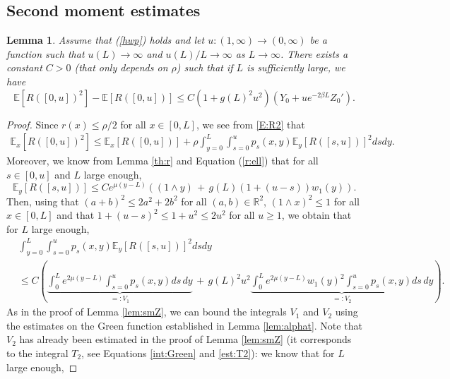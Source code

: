 \documentclass[11pt]{article}
\theoremstyle{plain}
\newtheorem{lemma}{Lemma}[section]
\begin{document}
\subsection{Second moment estimates}\label{sec:smR}
\begin{lemma}\label{lem:sdmR}
Assume that (\ref{hwp}) holds and let $u:(1,\infty)\rightarrow (0,\infty)$ be a function such that $u(L)\rightarrow \infty$  and $u(L)/L\rightarrow \infty$ as $L\rightarrow \infty$. There exists a constant $C>0$ (that only depends on $\rho$) such that if $L$ is sufficiently large, we have \begin{equation*}
\mathbb{E}\left[R([0,u])^2\right]-\mathbb{E}\left[R([0,u])\right]\leqslant C\left(1+g(L)^2u^2\right)(Y_0+ue^{-2\beta L}Z_0').
\end{equation*}
\end{lemma}
\begin{proof}
Since  $r(x)\leqslant \rho/2$ for all $x\in[0,L]$, we see from   \eqref{E:R2}  that
\begin{align*}
\mathbb{E}_x\left[R([0,u])^2\right]\leqslant \mathbb{E}_x\left[R([0,u])\right]+\rho\int_{y=0}^L\int_{s=0}^up_s(x,y)\mathbb{E}_y\left[R([s,u])\right]^2dsdy.
\end{align*}
Moreover, we know from Lemma \ref{th:r} and Equation (\ref{r:ell}) that for all $s\in[0,u]$ and $L$ large enough, 
\begin{equation*}
\mathbb{E}_y\left[R([s,u])\right]\leqslant Ce^{\mu(y-L)}((1\wedge y)\,+\,g(L)(1+(u-s))w_1(y)).
\end{equation*}
Then, using that $(a+b)^2\leqslant 2a^2+2b^2$ for all $(a,b)\in\mathbb{R}^2$, $(1\wedge x)^2\leqslant 1$ for all $x\in[0,L]$ and that $1+(u-s)^2\leqslant 1+u^2\leqslant 2u^2$ for all $u\geqslant 1$,  we obtain that for $L$ large enough,
\begin{align}
&\int_{y=0}^L\int_{s=0}^up_s(x,y)\mathbb{E}_y\left[R([s,u])\right]^2dsdy\label{eq:smR}\\
&\leqslant C\left(\underbrace{\int_0^Le^{2\mu(y-L)}\int_{s=0}^u p_s(x,y)ds\,dy}_{\textstyle=:V_1}\,+\,g(L)^2u^2\underbrace{\int_0^Le^{2\mu(y-L)}w_1(y)^2\int_{s=0}^u p_s(x,y)ds\,dy}_{\textstyle=:V_2}\right). \nonumber
\end{align}
As in the proof of Lemma \ref{lem:smZ}, we can bound the integrals $V_1$ and $V_2$ using the estimates on the Green function established in Lemma \ref{lem:alphat}. Note that $V_2$ has already been estimated in the proof of Lemma \ref{lem:smZ} (it corresponds to the integral $T_2$, see Equations \eqref{int:Green} and \eqref{est:T2}): we know that for $L$ large enough,

\end{proof}
\end{document}
